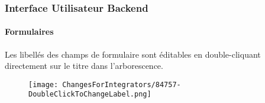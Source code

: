 
\begin{frame}[fragile]
	\frametitle{Interface Utilisateur Backend}
	\framesubtitle{Formulaires}

	\lstset{basicstyle=\tiny\ttfamily}

	Les libellés des champs de formulaire sont éditables en double-cliquant directement sur le titre dans l'arborescence.

	\begin{figure}
		\texttt{[image: ChangesForIntegrators/84757-DoubleClickToChangeLabel.png]}
	\end{figure}

\end{frame}

